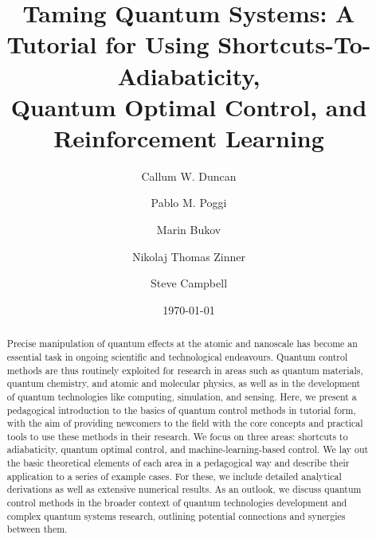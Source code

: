 \documentclass[floatfix,aps,reprint,superscriptaddress,amsmath,amssymb,footnotebib,onecolumn]{revtex4-2}
\begin{document}
\title{Taming Quantum Systems: A Tutorial for Using Shortcuts-To-Adiabaticity, \\ 
Quantum Optimal Control, and Reinforcement Learning 
}

\author{Callum W. Duncan}
\author{Pablo M. Poggi}
\author{Marin Bukov}
\author{Nikolaj Thomas Zinner}
\author{Steve Campbell}

\begin{abstract}
\vskip1cm
Precise manipulation of quantum effects at the atomic and nanoscale has become an essential task in ongoing scientific and technological endeavours. Quantum control methods are thus routinely exploited for research in areas such as quantum materials, quantum chemistry, and atomic and molecular physics, as well as in the development of quantum technologies like computing, simulation, and sensing.  Here, we present a pedagogical introduction to the basics of quantum control methods in tutorial form, with the aim of providing newcomers to the field with the core concepts and practical tools to use these methods in their research. We focus on three areas: shortcuts to adiabaticity, quantum optimal control, and machine-learning-based control. We lay out the basic theoretical elements of each area in a pedagogical way and describe their application to a series of example cases. For these, we include detailed analytical derivations as well as extensive numerical results.
As an outlook, we discuss quantum control methods in the broader context of quantum technologies development and complex quantum systems research, outlining potential connections and synergies between them.
\end{abstract}
\date{\today}
\maketitle
\end{document}
